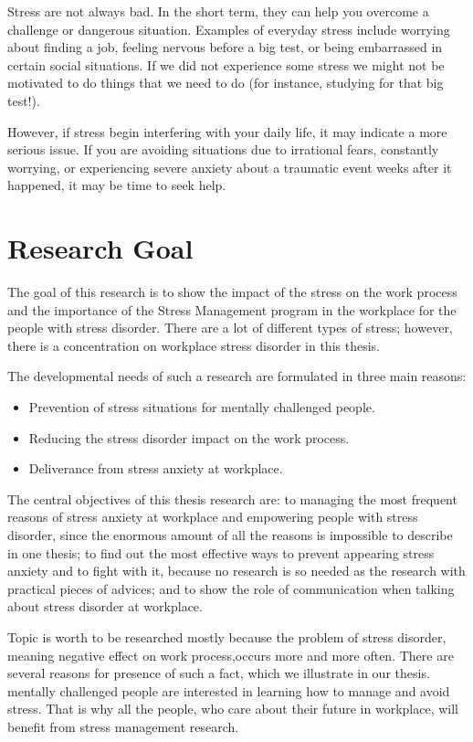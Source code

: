 Stress are not always bad. In the short term, they can help you overcome a challenge or dangerous situation. Examples of everyday stress include worrying about finding a job, feeling nervous before a big test, or being embarrassed in certain social situations. If we did not experience some stress we might not be motivated to do things that we need to do (for instance, studying for that big test!).

However, if stress begin interfering with your daily life, it may indicate a more serious issue. If you are avoiding situations due to irrational fears, constantly worrying, or experiencing severe anxiety about a traumatic event weeks after it happened, it may be time to seek help.

\section{Research Goal}
The goal of this research is to show the impact of the stress on the work process and the importance of the Stress Management program in the workplace for the people with stress disorder. There are a lot of different types of stress; however, there is a concentration on workplace stress disorder in this thesis.

The developmental needs of such a research are formulated in three main reasons:
\begin{itemize}
    \item Prevention of stress situations for mentally challenged people.
    \item Reducing the stress disorder impact on the work process.
    \item Deliverance from stress anxiety at workplace.
\end{itemize}
The central objectives of this thesis research are: to managing the most frequent reasons of stress anxiety at workplace and empowering people with stress disorder, since the enormous amount of all the reasons is impossible to describe in one thesis; to find out the most effective ways to prevent appearing stress anxiety and to fight with it, because no research is so needed as the research with practical pieces of advices; and to show the role of communication when talking about stress disorder at workplace.

Topic is worth to be researched mostly because the problem of stress disorder, meaning negative effect on work process,occurs more and more often. There are several reasons for presence of such a fact, which we illustrate in our thesis. mentally challenged people are interested in learning how to manage and avoid stress. That is why all the people, who care about their future in workplace, will benefit from stress management research. 

